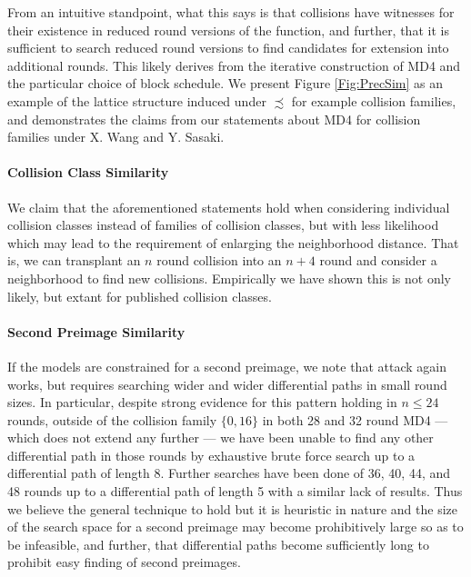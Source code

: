 \documentclass[conference]{IEEEtran}
\begin{document}
From an intuitive standpoint, what this says is that collisions have
witnesses for their existence in reduced round versions of the function, and
further, that it is sufficient to search reduced round versions to find
candidates for extension into additional rounds. This likely derives from
the iterative construction of MD4 and the particular choice of block schedule.
We present Figure \ref{Fig:PrecSim} as an example of the lattice structure
induced under $\precsim$ for example collision families, and
demonstrates the claims from our statements about MD4 for collision
families under X. Wang and Y. Sasaki.

\paragraph{Collision Class Similarity}

We claim that the aforementioned statements hold when considering individual
collision classes instead of families of collision classes, but with less
likelihood which may lead to the requirement of enlarging the
neighborhood distance. That is, we can transplant an $n$ round collision into an $n+4$
round and consider a neighborhood to find new collisions.  Empirically
we have shown this is not only likely, but extant for published
collision classes.

\paragraph{Second Preimage Similarity}

If the models are constrained for a second preimage, we note that attack again
works, but requires searching wider and wider differential paths in small round
sizes. In particular, despite strong evidence for this pattern holding in
$n \leq 24$ rounds, outside of the collision family $\{0, 16\}$ in both 28 and
32 round MD4 --- which does not extend any further --- we have been unable to find
any other differential path in those rounds by exhaustive brute force search
up to a differential path of length 8. Further searches have been done of
36, 40, 44, and 48 rounds up to a differential path of length 5 with a similar
lack of results. Thus we believe the general technique to hold but it
is heuristic in nature and the size
of the search space for a second preimage may become prohibitively
large so as to be infeasible, and
further, that differential paths become sufficiently long to prohibit easy
finding of second preimages.
\end{document}
